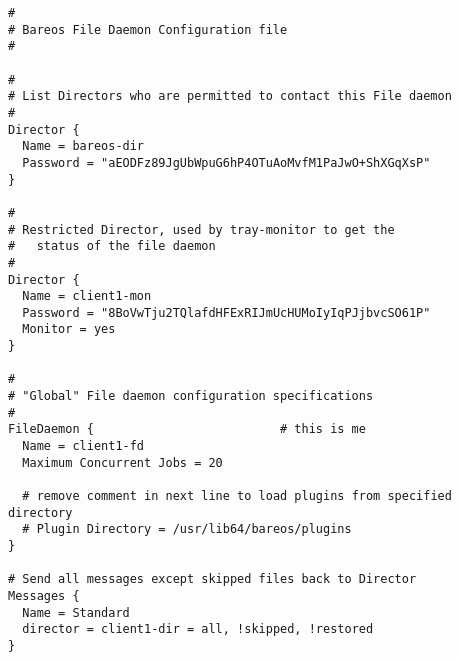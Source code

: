 \footnotesize
\begin{verbatim}
#
# Bareos File Daemon Configuration file
#

#
# List Directors who are permitted to contact this File daemon
#
Director {
  Name = bareos-dir
  Password = "aEODFz89JgUbWpuG6hP4OTuAoMvfM1PaJwO+ShXGqXsP"
}

#
# Restricted Director, used by tray-monitor to get the
#   status of the file daemon
#
Director {
  Name = client1-mon
  Password = "8BoVwTju2TQlafdHFExRIJmUcHUMoIyIqPJjbvcSO61P"
  Monitor = yes
}

#
# "Global" File daemon configuration specifications
#
FileDaemon {                          # this is me
  Name = client1-fd
  Maximum Concurrent Jobs = 20

  # remove comment in next line to load plugins from specified directory
  # Plugin Directory = /usr/lib64/bareos/plugins
}

# Send all messages except skipped files back to Director
Messages {
  Name = Standard
  director = client1-dir = all, !skipped, !restored
}
\end{verbatim}
\normalsize
